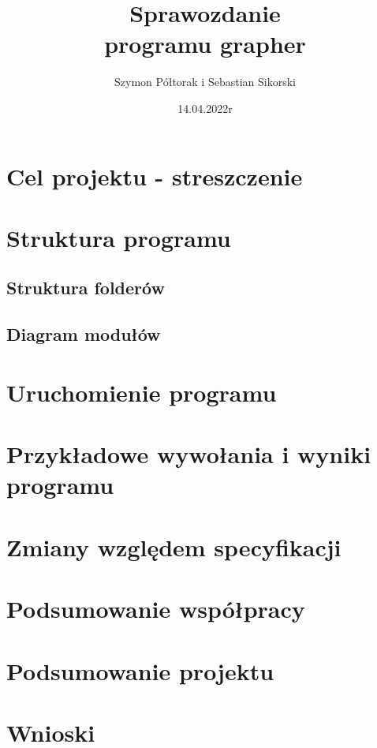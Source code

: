 \documentclass[10pt, a4paper]{report}
\title{\huge{\textbf{Sprawozdanie} \\ programu grapher}}
\author{Szymon Półtorak i Sebastian Sikorski}
\date{14.04.2022r}
\begin{document}
    \maketitle

    \renewcommand*\thesection{\arabic{section}}
    
    \begin{abstract}

    \end{abstract}

    \pagestyle{fancy}
    \fancyhf{}
    
    \tableofcontents
    \newpage

    \section{Cel projektu - streszczenie}

    \section{Struktura programu}

    \subsection{Struktura folderów}

    \subsection{Diagram modułów}

    \section{Uruchomienie programu}

    \section{Przykładowe wywołania i wyniki programu}

    \section{Zmiany względem specyfikacji}

    \section{Podsumowanie współpracy}

    \section{Podsumowanie projektu}

    \section{Wnioski}
\end{document}

